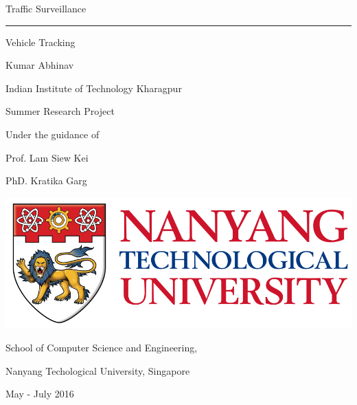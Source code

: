 \documentclass[a4paper,12pt]{article}
\begin{document}
	
	\begin{titlepage}
		\begin{center}
			\vspace*{1in}
			{\huge Traffic Surveillance}
			\vspace{0.1in}
			\hrule
			\vspace{0.1in}
			\par
			{\large Vehicle Tracking}
			\par
			\vspace{1.5in}
			{\Large Kumar Abhinav}
			\par
			\vspace{0.02in}
			{\normalsize Indian Institute of Technology Kharagpur}
			\par
			\vspace{0.5in}
			{\large Summer Research Project}
			\par
			\vspace{0.5in}
			Under the guidance of
			\par
			Prof. Lam Siew Kei
			\par
			PhD. Kratika Garg
			\par
			\vspace{0.25in}
			\graphicspath{ {/home/n1502414k/Traffic_Surveillance/My_Project/} }
			\includegraphics[scale= 0.125]{NTULogo}
			\vspace{0.15in}
			\par
			School of Computer Science and Engineering,
			\par
			Nanyang Techological University, Singapore
			\par
			\vspace{0.5in}
			May - July 2016
		\end{center}
	\end{titlepage}
	
	
\end{document}
